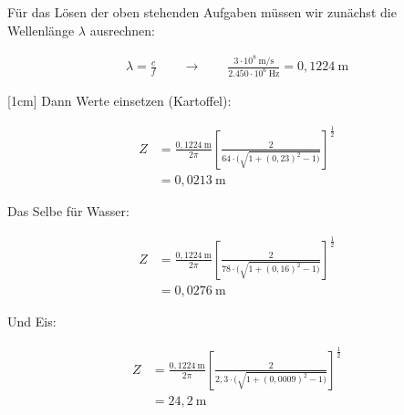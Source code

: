 \documentclass[a4paper,10pt]{article}
\begin{document}
\ppbig 


Für das Lösen der oben stehenden Aufgaben müssen wir zunächst die Wellenlänge $\lambda$ ausrechnen:


\begin{align*}
\lambda = \frac{c}{f} \qquad \rightarrow \qquad \frac{3 \cdot 10^8 ~\text{m/s}}{2.450 \cdot 10^6 ~\text{Hz}} = 0,1224 ~\text{m}
\end{align*}

\reversemarginpar
{}[1cm]
Dann Werte einsetzen (Kartoffel): 

\begin{align*}
Z &= \frac{0,1224 ~\text{m}}{2 \pi} \left[ \frac{2}{64 \cdot (\sqrt{1+ (0,23)^2 - 1)}} \right]^{\frac{1}{2}} \\
 &= 0,0213 ~\text{m}
\end{align*}

Das Selbe für Wasser: 

\begin{align*}
Z &= \frac{0,1224 ~\text{m}}{2 \pi} \left[ \frac{2}{78 \cdot (\sqrt{1+ (0,16)^2 - 1)}} \right]^{\frac{1}{2}} \\
 &= 0,0276 ~\text{m}
\end{align*}


Und Eis:

\begin{align*}
Z &= \frac{0,1224 ~\text{m}}{2 \pi} \left[ \frac{2}{2,3 \cdot (\sqrt{1+ (0,0009)^2 - 1)}} \right]^{\frac{1}{2}} \\
 &= 24,2 ~\text{m}
\end{align*}


\ppbig

\end{document}
